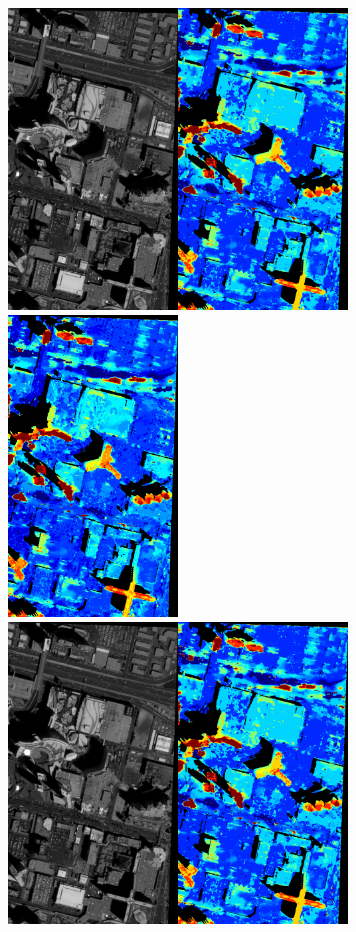 \documentclass{article}
\theoremstyle{definition}
\begin{document}
\begin{figure}[ht]
 \centering
 \includegraphics[height=8cm]{images/SkysatLR01_120/1521737975374_dmap_050.png}\hspace{-0.28em}
 \includegraphics[height=8cm]{images/SkysatLR01_240/1521738847855_dmap_050.png}\\
 \vspace{-0.11em}
 \includegraphics[height=8cm]{images/SkysatLR01_120/1521737975374_dmap_025.png}\hspace{-0.28em}

\end{figure}
\end{document}
